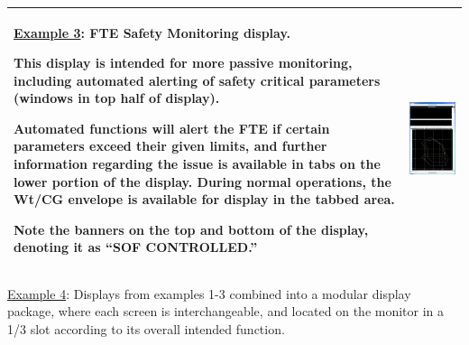 \documentclass[
]{book}
\begin{document}
\begin{longtable}[]{@{}ll@{}}
\toprule
\endhead
\begin{minipage}[t]{0.46\columnwidth}\raggedright
\underline{Example 3}: FTE
Safety Monitoring display.

This display is intended for more
passive monitoring, including
automated alerting of safety critical
parameters (windows in top half of
display).

Automated functions will alert the FTE
if certain parameters exceed their
given limits, and further information
regarding the issue is available in
tabs on the lower portion of the
display. During normal operations, the
Wt/CG envelope is available for
display in the tabbed area.

Note the banners on the top and bottom
of the display, denoting it as ``SOF
CONTROLLED.''\strut
\end{minipage} & \begin{minipage}[t]{0.48\columnwidth}\raggedright
\includegraphics{media/21/fte-safety-monitoring.png}\strut
\end{minipage}\tabularnewline
\bottomrule
\end{longtable}

\underline{Example 4}: Displays from examples 1-3 combined into a modular display package, where each screen is interchangeable, and located on the monitor in a 1/3 slot according to its overall intended function.
\end{document}

